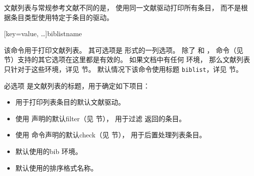 文献列表与常规参考文献不同的是，
使用同一文献驱动打印所有条目，
而不是根据条目类型使用特定于条目的驱动。

\begin{ltxsyntax}

[key=value, \dots]{biblistname}


该命令用于打印文献列表。
其可选项是 \keyval 形式的一列选项。
除了  和 ，
 命令（见  节）支持的其它选项在这里都是有效的。
如果文档中有任何  环境，
那么文献列表只针对于这些环境，详见  节。
默认情况下该命令使用标题 \texttt{biblist}，详见  节。

必选项  是文献列表的标题，用于确定如下项目：
\begin{itemize}
\item %
用于打印列表条目的默认文献驱动。
\item %
使用  声明的默认filter（见  节），
用于过滤 \biber 返回的条目。
\item %
使用  命令声明的默认check（见  节），
用于后置处理列表条目。
\item %
默认使用的bib 环境。
\item %
默认使用的排序格式名称。
\end{itemize}



\end{ltxsyntax}

